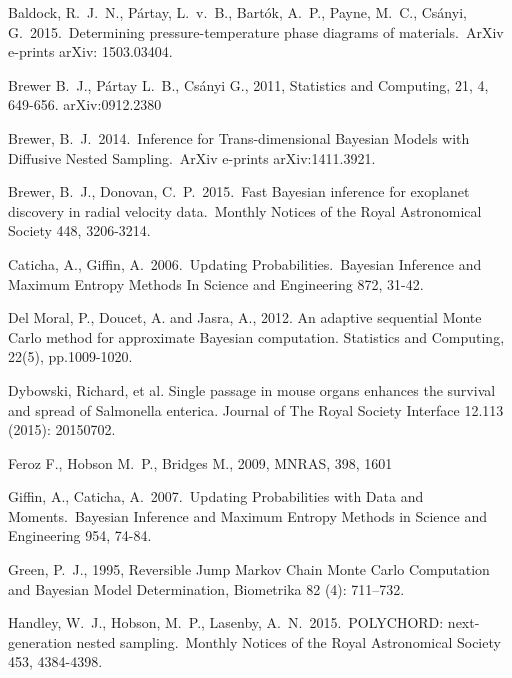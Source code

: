 \documentclass[article]{jss}
\begin{document}
\begin{thebibliography}{99}
 Baldock, R.~J.~N., 
P{\'a}rtay, L.~v.~B., Bart{\'o}k, A.~P., Payne, M.~C., Cs{\'a}nyi, G.\ 
2015.\ Determining pressure-temperature phase diagrams of materials.\ ArXiv 
e-prints arXiv: 1503.03404. 

 Brewer B.~J., P{\'a}rtay L.~B., Cs{\'a}nyi G., 2011,
Statistics and Computing, 21, 4, 649-656. arXiv:0912.2380

 Brewer, B.~J.\ 2014.\ Inference for Trans-dimensional Bayesian Models with Diffusive Nested Sampling.\ ArXiv e-prints arXiv:1411.3921.

 Brewer, B.~J., Donovan, C.~P.\ 2015.\ Fast Bayesian inference for exoplanet discovery in radial velocity data.\ Monthly Notices of the Royal Astronomical Society 448, 3206-3214. 

 Caticha, A., Giffin, A.\ 2006.\ Updating Probabilities.\ Bayesian Inference and Maximum Entropy Methods In Science and Engineering 872, 31-42. 

Del Moral, P., Doucet, A. and Jasra, A., 2012. An adaptive sequential Monte Carlo method for approximate Bayesian computation. Statistics and Computing, 22(5), pp.1009-1020.

Dybowski, Richard, et al. Single passage in mouse organs enhances the survival and spread of Salmonella enterica. Journal of The Royal Society Interface 12.113 (2015): 20150702.

 Feroz F., Hobson M.~P., Bridges M., 2009, MNRAS, 398, 1601

 Giffin, A., Caticha, A.\ 2007.\ Updating Probabilities with Data and Moments.\ Bayesian Inference and Maximum Entropy
Methods in Science and Engineering 954, 74-84. 

Green, P.~J., 1995, Reversible Jump Markov Chain Monte Carlo Computation and Bayesian Model Determination, Biometrika 82 (4): 711–732.

 Handley, W.~J., Hobson, M.~P., Lasenby, A.~N.\ 2015.\ POLYCHORD: next-generation nested sampling.\ Monthly Notices of the Royal Astronomical Society 453, 4384-4398. 


\end{thebibliography}
\end{document}

